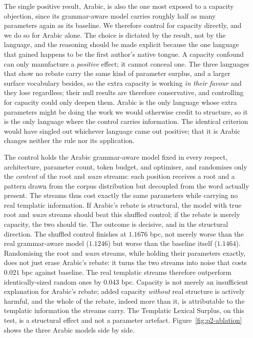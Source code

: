 The single positive result, Arabic, is also the one most exposed to a capacity objection, since its grammar-aware model carries roughly half as many parameters again as its baseline. We therefore control for capacity directly, and we do so for Arabic alone. The choice is dictated by the result, not by the language, and the reasoning should be made explicit because the one language that gained happens to be the first author's native tongue. A capacity confound can only manufacture a \emph{positive} effect; it cannot conceal one. The three languages that show no rebate carry the same kind of parameter surplus, and a larger surface vocabulary besides, so the extra capacity is working \emph{in their favour} and they lose regardless; their null results are therefore conservative, and controlling for capacity could only deepen them. Arabic is the only language whose extra parameters might be doing the work we would otherwise credit to structure, so it is the only language where the control carries information. The identical criterion would have singled out whichever language came out positive; that it is Arabic changes neither the rule nor its application.

The control holds the Arabic grammar-aware model fixed in every respect, architecture, parameter count, token budget, and optimiser, and randomises only the \emph{content} of the root and \emph{wazn} streams: each position receives a root and a pattern drawn from the corpus distribution but decoupled from the word actually present. The streams thus cost exactly the same parameters while carrying no real templatic information. If Arabic's rebate is structural, the model with true root and \emph{wazn} streams should beat this shuffled control; if the rebate is merely capacity, the two should tie. The outcome is decisive, and in the structural direction. The shuffled control finishes at $1.1676$ bpc, not merely worse than the real grammar-aware model ($1.1246$) but worse than the baseline itself ($1.1464$). Randomising the root and \emph{wazn} streams, while holding their parameters exactly, does not just erase Arabic's rebate: it turns the two streams into noise that costs $0.021$ bpc against baseline. The real templatic streams therefore outperform identically-sized random ones by $0.043$ bpc. Capacity is not merely an insufficient explanation for Arabic's rebate; added capacity \emph{without} real structure is actively harmful, and the whole of the rebate, indeed more than it, is attributable to the templatic information the streams carry. The Templatic Lexical Surplus, on this test, is a structural effect and not a parameter artefact. Figure~\ref{fig:p2-ablation} shows the three Arabic models side by side.

